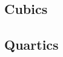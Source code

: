 \documentclass{article}
\begin{document}
\subsection{Cubics}

































{
}





























\subsection{Quartics}







































\end{document}
